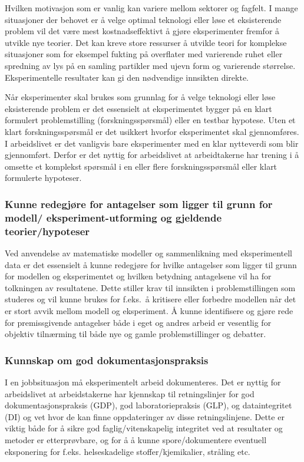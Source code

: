 \documentclass{article}
\begin{document}
Hvilken motivasjon som er vanlig kan variere mellom sektorer og fagfelt.
I mange situasjoner der behovet er å velge optimal teknologi eller løse et eksisterende problem vil det være mest kostnadseffektivt å gjøre eksperimenter fremfor å utvikle nye teorier.
Det kan kreve store ressurser å utvikle teori for komplekse situasjoner som for eksempel fukting på overflater med varierende ruhet eller spredning av lys på en samling partikler med ujevn form og varierende størrelse.
Eksperimentelle resultater kan gi den nødvendige innsikten direkte.

Når eksperimenter skal brukes som grunnlag for å velge teknologi eller løse eksisterende problem er det essensielt at eksperimentet bygger på en klart formulert problemstilling (forskningsspørsmål) eller en testbar hypotese. Uten et klart forskningsspørsmål er det usikkert hvorfor eksperimentet skal gjennomføres. I arbeidslivet er det vanligvis bare eksperimenter med en klar nytteverdi som blir gjennomført. Derfor er det nyttig for arbeidslivet at arbeidtakerne har trening i å omsette et komplekst spørsmål i en eller flere forskningsspørsmål eller klart formulerte hypoteser.

\subsubsection{Kunne redegjøre for antagelser som ligger til grunn for modell/ eksperiment-utforming og gjeldende teorier/hypoteser}
Ved anvendelse av matematiske modeller og sammenlikning med eksperimentell data er det essensielt å kunne redegjøre for hvilke antagelser som ligger til grunn for modellen og eksperimentet og hvilken betydning antagelsene vil ha for tolkningen av resultatene.
Dette stiller krav til innsikten i problemstillingen som studeres og vil kunne brukes for f.eks.~å kritisere eller forbedre modellen når det er stort avvik mellom modell og eksperiment.
Å kunne identifisere og gjøre rede for premissgivende antagelser både i eget og andres arbeid er vesentlig for objektiv tilnærming til både nye og gamle problemstillinger og debatter.

\subsubsection{Kunnskap om god dokumentasjonspraksis}
I en jobbsituasjon må eksperimentelt arbeid dokumenteres. Det er nyttig for arbeidslivet at arbeidstakerne har kjennskap til retningslinjer for god dokumentasjonspraksis (GDP), god laboratoriepraksis (GLP), og dataintegritet (DI) og vet hvor de kan finne oppdateringer av disse retningslinjene.
Dette er viktig både for å sikre god faglig/vitenskapelig integritet ved at resultater og metoder er etterprøvbare, og for å å kunne spore/dokumentere eventuell eksponering for f.eks. helseskadelige stoffer/kjemikalier, stråling etc.
\end{document}
